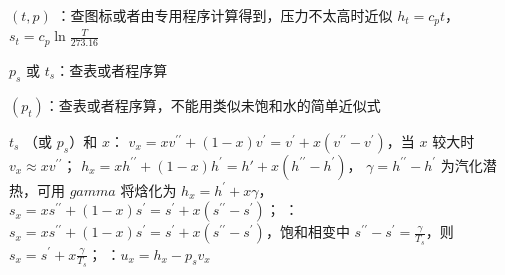  $(t,p)$ ：查图标或者由专用程序计算得到，压力不太高时近似 $h_t = c_p t$，$s_t=c_p\ln\frac{T}{273.16}$

 $p_s$ 或 $t_s$：查表或者程序算

 $(p_t)$：查表或者程序算，不能用类似未饱和水的简单近似式

 $t_s$ （或 $p_s$）和 $x$：
 $v_x=xv^{\prime\prime}+(1-x)v^\prime=v^\prime+x(v^{\prime\prime}-v^\prime)$，当 $x$ 较大时 $v_x\approx xv^{\prime\prime}$；
 $h_x=xh^{\prime\prime}+(1-x)h^\prime=h\prime+x(h^{\prime\prime}-h^\prime)$，
$\gamma = h^{\prime\prime}-h^\prime$ 为汽化潜热，可用 $gamma$ 将焓化为 $h_x=h^\prime+x\gamma$，$s_x=xs^{\prime\prime}+(1-x)s^\prime=s^\prime+x(s^{\prime\prime}-s^\prime)$；
：$s_x=xs^{\prime\prime}+(1-x)s^\prime=s^\prime+x(s^{\prime\prime}-s^\prime)$，饱和相变中 $s^{\prime\prime}-s^\prime=\frac{\gamma}{T_s}$，则 $s_x=s^\prime+x\frac{\gamma}{T_s}$；
：$u_x=h_x-p_sv_x$

\divider